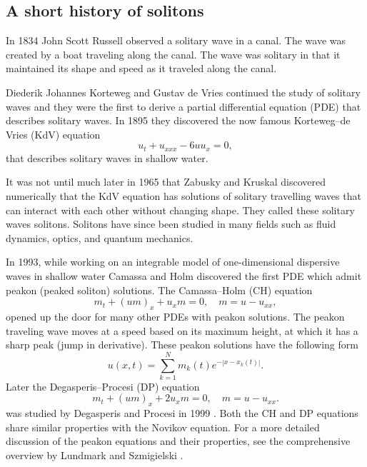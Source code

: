 \documentclass[english,master]{liumaiex}
\theoremstyle{plain}
\theoremstyle{definition}
\begin{document}
\subsection{A short history of solitons}

In 1834 John Scott Russell observed a solitary wave in a canal. The wave was created by a boat traveling along the canal. The wave was solitary in that it maintained its shape and speed as it traveled along the canal.

Diederik Johannes Korteweg and Gustav de Vries continued the study of solitary waves and they were the first to derive a partial differential equation (PDE) that describes solitary waves. In 1895 they discovered the now famous Korteweg--de Vries (KdV) equation
\begin{equation}
	u_t + u_{xxx} - 6uu_x = 0,
\end{equation}
that describes solitary waves in shallow water.

It was not until much later in 1965 that Zabusky and Kruskal \cite{Zabusky1965} discovered numerically that the KdV equation has solutions of solitary travelling waves that can interact with each other without changing shape. They called these solitary waves solitons. Solitons have since been studied in many fields such as fluid dynamics, optics, and quantum mechanics.

In 1993\cite{Camassa_1993}, while working on an integrable model of one-dimensional dispersive waves in shallow water Camassa and Holm discovered the first PDE which admit peakon (peaked soliton) solutions. The Camassa--Holm (CH) equation
\begin{equation} \label{eq:CH}
	m_t + (um)_x + u_xm = 0,\quad m = u - u_{xx},
\end{equation}
opened up the door for many other PDEs with peakon solutions. The peakon traveling wave moves at a speed based on its maximum height, at which
it has a sharp peak (jump in derivative). These peakon solutions have the following form
\begin{equation} \label{eq:peakon}
	u(x, t) = \sum_{k = 1}^{N} m_k(t) e^{-|x - x_k(t)|}.
\end{equation}
Later the Degasperis--Procesi (DP) equation
\begin{equation} \label{eq:DP}
	m_t + (um)_x + 2u_xm = 0,\quad m = u - u_{xx}.
\end{equation}
was studied by Degasperis and Procesi in 1999 \cite{Degasperis_1999}. Both the CH and DP equations share similar properties with the Novikov equation. For a more detailed discussion of the peakon equations and their properties, see the comprehensive overview by Lundmark and Szmigielski \cite{Lundmark_2022}.
\end{document}
